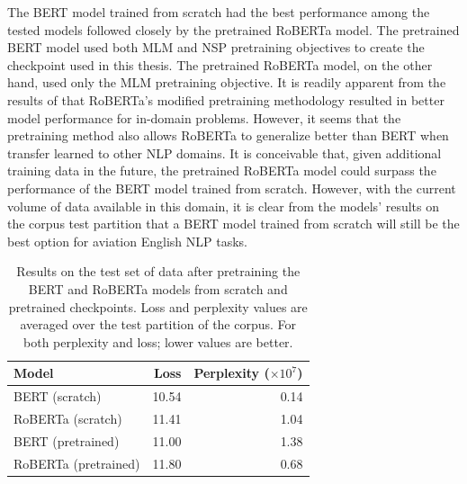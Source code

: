 \documentclass[12pt]{article}
\begin{document}
The BERT model trained from scratch had the best performance among the tested models followed closely by the pretrained RoBERTa model. The pretrained
BERT model used both MLM and NSP pretraining objectives to create the checkpoint used in this thesis. The pretrained RoBERTa model, on the other hand,
used only the MLM pretraining objective. It is readily apparent from the results of \cite{liu_roberta_2019} that RoBERTa's modified pretraining
methodology resulted in better model performance for in-domain problems. However, it seems that the pretraining method also allows RoBERTa to
generalize better than BERT when transfer learned to other NLP domains. It is conceivable that, given additional training data in the future, the
pretrained RoBERTa model could surpass the performance of the BERT model trained from scratch. However, with the current volume of data available in
this domain, it is clear from the models' results on the corpus test partition that a BERT model trained from scratch will still be the best option
for aviation English NLP tasks.

\begin{table}[!t]
    \centering
    \begin{tabular}{l r r}
        \toprule
        Model                & Loss  & Perplexity ($\times 10^7$) \\
        \midrule
        BERT (scratch)       & 10.54 & 0.14                       \\ %
        RoBERTa (scratch)    & 11.41 & 1.04                       \\ %
        BERT (pretrained)    & 11.00 & 1.38                       \\ %
        RoBERTa (pretrained) & 11.80 & 0.68                       \\ %
        \bottomrule
    \end{tabular}
    \caption{Results on the test set of data after pretraining the BERT and RoBERTa models from scratch and pretrained checkpoints. Loss and
        perplexity values are averaged over the test partition of the corpus. For both perplexity and loss; lower values are better.}
    \label{tab:pretraining_results}
\end{table}
\end{document}
